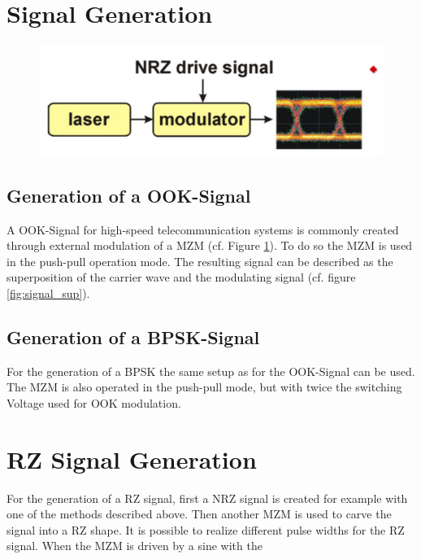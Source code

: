 \section{Signal Generation}
\begin{figure}
  \centering
  \includegraphics[width=.5\columnwidth]{Grafiken/Signal-generation.jpg}

\caption{}
\label{fig:signal}
\end{figure}
\subsection{Generation of a OOK-Signal}
A OOK-Signal for high-speed telecommunication systems is commonly created through external modulation of a MZM (cf. Figure \ref{fig:signal}). To do so the MZM is used in the push-pull operation mode. The resulting signal can be described as the superposition of the carrier wave and the modulating signal (cf. figure \ref{fig:signal_sup}). \footnotemark[1]
\subsection{Generation of a BPSK-Signal}
For the generation of a BPSK the same setup as for the OOK-Signal can be used. The MZM is also operated in the push-pull mode, but with twice the switching Voltage used for OOK modulation.  \footnotemark[1]

\section{RZ Signal Generation}
For the generation of a RZ signal, first a NRZ signal is created for example with one of the methods described above. Then another MZM is used to carve the signal into a RZ shape. It is possible to realize different pulse widths for the RZ signal. When the MZM is driven by a sine with the 